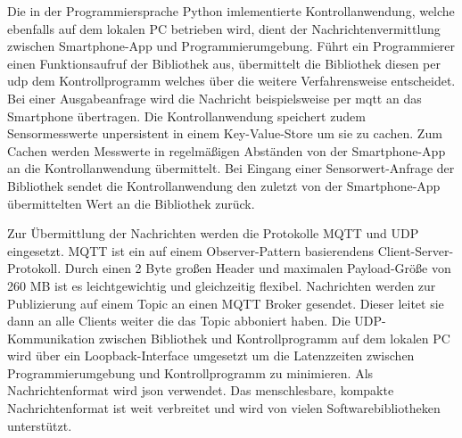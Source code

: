 \documentclass[11pt,a4paper]{report}
\begin{document}
Die in der Programmiersprache Python imlementierte Kontrollanwendung, welche ebenfalls auf dem lokalen PC betrieben wird, dient der Nachrichtenvermittlung zwischen Smartphone-App und Programmierumgebung.
Führt ein Programmierer einen Funktionsaufruf der Bibliothek aus, übermittelt die Bibliothek diesen per \acrshort{udp} dem Kontrollprogramm welches über die weitere Verfahrensweise entscheidet.
Bei einer Ausgabeanfrage wird die Nachricht beispielsweise per \acrshort{mqtt} an das Smartphone übertragen.
Die Kontrollanwendung speichert zudem Sensormesswerte unpersistent in einem Key-Value-Store um sie zu cachen.
Zum Cachen werden Messwerte in regelmäßigen Abständen von der Smartphone-App an die Kontrollanwendung übermittelt.
Bei Eingang einer Sensorwert-Anfrage der Bibliothek sendet die Kontrollanwendung den zuletzt von der Smartphone-App übermittelten Wert an die Bibliothek zurück.

Zur Übermittlung der Nachrichten werden die Protokolle MQTT und UDP eingesetzt.
MQTT ist ein auf einem Observer-Pattern basierendens Client-Server-Protokoll.
Durch einen 2 Byte großen Header und maximalen Payload-Größe von 260 MB ist es leichtgewichtig und gleichzeitig flexibel.
Nachrichten werden zur Publizierung auf einem Topic an einen MQTT Broker gesendet.
Dieser leitet sie dann an alle Clients weiter die das Topic abboniert haben.
Die UDP-Kommunikation zwischen Bibliothek und Kontrollprogramm auf dem lokalen PC wird über ein Loopback-Interface umgesetzt um die Latenzzeiten zwischen Programmierumgebung und Kontrollprogramm zu minimieren.
Als Nachrichtenformat wird \acrshort{json} verwendet.
Das menschlesbare, kompakte Nachrichtenformat ist weit verbreitet und wird von vielen Softwarebibliotheken unterstützt.
\end{document}

